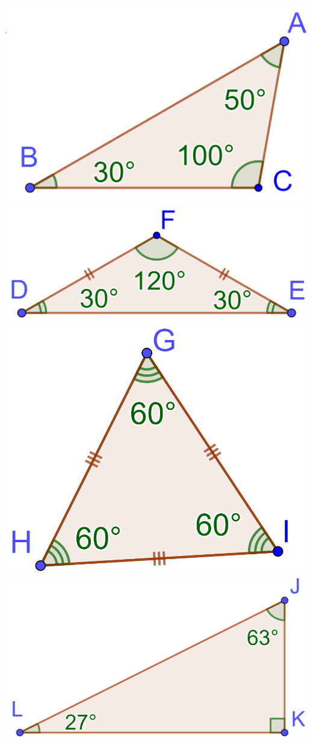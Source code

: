 \documentclass[12pt,a4paper]{article}
\begin{document}
\begin{myexs}
\begin{multicols}{2}
		\begin{center}	
			\includegraphics[scale=0.18]{quelconque}	
			\includegraphics[scale=0.18]{isocele}	
			\includegraphics[scale=0.18]{equilateral}
			\includegraphics[scale=0.18]{rectangle}

\end{center}
\end{multicols}
\end{myexs}
\end{document}
